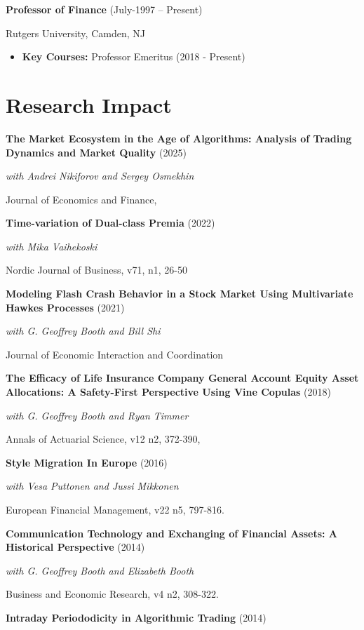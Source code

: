 \documentclass[11pt,a4paper,]{awesome-cv}
\begin{document}
\textbf{Professor of Finance} (July-1997 -- Present)

Rutgers University, Camden, NJ

\begin{itemize}
\item \textbf{Key Courses:} Professor Emeritus (2018 - Present)
\end{itemize}

\section{Research Impact}\label{research-impact}

\textbf{The Market Ecosystem in the Age of Algorithms: Analysis of Trading Dynamics and Market Quality}
(2025)

\textit{with Andrei Nikiforov and Sergey Osmekhin}

Journal of Economics and Finance,

\textbf{Time-variation of Dual-class Premia} (2022)

\textit{with Mika Vaihekoski}

Nordic Journal of Business, v71, n1, 26-50

\textbf{Modeling Flash Crash Behavior in a Stock Market Using Multivariate Hawkes Processes}
(2021)

\textit{with G. Geoffrey Booth and Bill Shi}

Journal of Economic Interaction and Coordination

\textbf{The Efficacy of Life Insurance Company General Account Equity Asset Allocations: A Safety-First Perspective Using Vine Copulas}
(2018)

\textit{with G. Geoffrey Booth and Ryan Timmer}

Annals of Actuarial Science, v12 n2, 372-390,

\textbf{Style Migration In Europe} (2016)

\textit{with Vesa Puttonen and Jussi Mikkonen}

European Financial Management, v22 n5, 797-816.

\textbf{Communication Technology and Exchanging of Financial Assets: A Historical Perspective}
(2014)

\textit{with G. Geoffrey Booth and Elizabeth Booth}

Business and Economic Research, v4 n2, 308-322.

\textbf{Intraday Periododicity in Algorithmic Trading} (2014)
\end{document}
